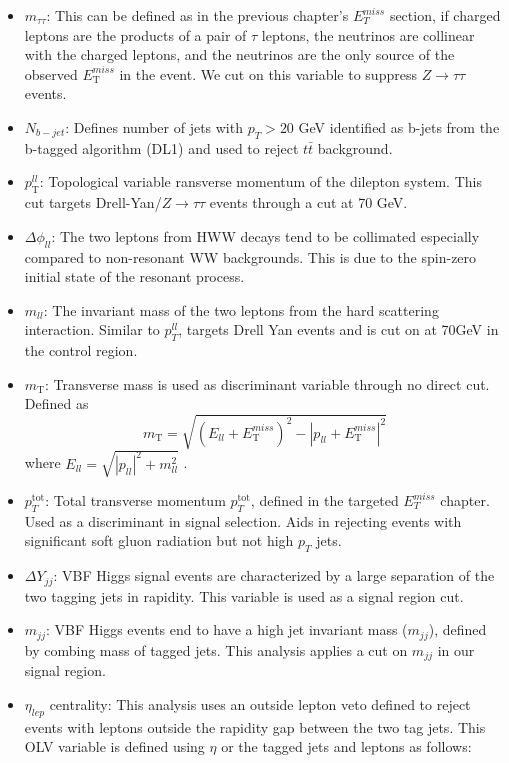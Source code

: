 \begin{itemize}
\item $m_{\tau \tau}$: This can be defined as in the previous chapter's $E_T^{miss}$ section, if charged leptons are the products of a pair of $\tau$ leptons, the neutrinos are collinear with the charged leptons, and the neutrinos are the only source of the observed $E_\mathrm{{T}}^{miss}$ in the event. We cut on this variable to suppress $Z\rightarrow\tau\tau$  events. 
\item $N_{b-jet}$: Defines number of jets with $p_T >20$ GeV identified as b-jets from the b-tagged algorithm (DL1) and used to reject $t\bar{t}$ background.
\item $p_\mathrm{{T}}^{ll}$: Topological variable ransverse momentum of the dilepton system. This cut targets Drell-Yan/$Z\rightarrow\tau\tau$ events through a cut at 70 GeV. 
\item $\Delta \phi_{ll}$: The two leptons from HWW decays tend to be collimated especially compared to non-resonant WW backgrounds. This is due to the spin-zero initial state of the resonant process. 
\item $m_{ll}$: The invariant mass of the two leptons from the hard scattering interaction. Similar to $p_T^{ll}$, targets Drell Yan events and is cut on at 70GeV in the control region.
\item $m_\mathrm{{T}}$: Transverse mass is used as discriminant variable through no direct cut. Defined as
\begin{equation}
m_\mathrm{{T}} = \sqrt{ {(E_{ll} + E_\mathrm{{T}}^{miss})}^2 - {|p_{ll} + E_\mathrm{{T}}^{miss}|}^2 }
\end{equation}
  where $E_{ll} = \sqrt{|p_{ll}|^2 + m_{ll}^2 }$ .
\item $p_T^\mathrm{tot}$:
Total transverse momentum $p_T^\mathrm{tot}$, defined in the targeted $E_T^{miss}$ chapter. Used as a discriminant in signal selection. Aids in rejecting events with significant soft gluon radiation but not high $p_T$ jets.
\item  $\Delta Y_{jj}$: VBF Higgs signal events are characterized by a large separation of the two tagging jets in rapidity. This variable is used as a signal region cut. 
\item $m_{jj}$:
VBF Higgs events end to have a high jet invariant mass ($m_{jj}$), defined by combing mass of tagged jets. This analysis applies a cut on $m_{jj}$ in our signal region. 
\item $\eta_{lep}$ centrality: This analysis uses an outside lepton veto defined to reject events with leptons outside the rapidity gap between the two tag jets. This OLV variable is defined using $\eta$ or the tagged jets and leptons as follows:

\end{itemize}
